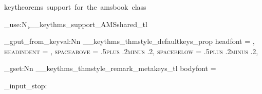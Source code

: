   {keytheorems~support~for~the~amsbook~class}

\tl_use:N \c__keythms_support_AMSshared_tl

\prop_gput_from_keyval:Nn \g__keythms_thmstyle_defaultkeys_prop
  {
    headfont   = \scshape,
    headindent = \parindent,
    spaceabove = .5\baselineskip plus .2\baselineskip minus .2\baselineskip,
    spacebelow = .5\baselineskip plus .2\baselineskip minus .2\baselineskip,
  }

\tl_gset:Nn \g__keythms_thmstyle_remark_metakeys_tl { bodyfont = \normalfont }

\file_input_stop: